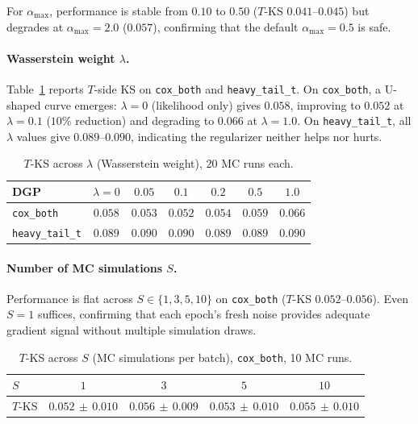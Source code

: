 For $\alpha_{\max}$, performance is stable from $0.10$ to $0.50$
($T$-KS $0.041$--$0.045$) but degrades at $\alpha_{\max} = 2.0$
($0.057$), confirming that the default $\alpha_{\max} = 0.5$ is safe.

\paragraph{Wasserstein weight $\lambda$.}
Table~\ref{tab:sens-lambda} reports $T$-side KS on \texttt{cox\_both}
and \texttt{heavy\_tail\_t}. On \texttt{cox\_both}, a U-shaped curve
emerges: $\lambda = 0$ (likelihood only) gives $0.058$, improving to
$0.052$ at $\lambda = 0.1$ ($10\%$ reduction) and degrading to $0.066$
at $\lambda = 1.0$. On \texttt{heavy\_tail\_t}, all $\lambda$ values
give $0.089$--$0.090$, indicating the regularizer neither helps nor
hurts.

\begin{table}[h]
\caption{$T$-KS across $\lambda$ (Wasserstein weight), 20 MC runs each.}
\label{tab:sens-lambda}
\centering
\small
\begin{tabular}{lcccccc}
\toprule
DGP & $\lambda{=}0$ & $0.05$ & $0.1$ & $0.2$ & $0.5$ & $1.0$ \\
\midrule
\texttt{cox\_both} & $0.058$ & $0.053$ & $\mathbf{0.052}$ & $0.054$ & $0.059$ & $0.066$ \\
\texttt{heavy\_tail\_t} & $0.089$ & $0.090$ & $0.090$ & $0.089$ & $0.089$ & $0.090$ \\
\bottomrule
\end{tabular}
\end{table}

\paragraph{Number of MC simulations $S$.}
Performance is flat across $S \in \{1, 3, 5, 10\}$ on \texttt{cox\_both}
($T$-KS $0.052$--$0.056$). Even $S = 1$ suffices, confirming that each
epoch's fresh noise provides adequate gradient signal without multiple
simulation draws.

\begin{table}[h]
\caption{$T$-KS across $S$ (MC simulations per batch), \texttt{cox\_both}, 10 MC runs.}
\label{tab:sens-S}
\centering
\small
\begin{tabular}{lcccc}
\toprule
$S$ & $1$ & $3$ & $5$ & $10$ \\
\midrule
$T$-KS & $0.052\,{\pm}\,0.010$ & $0.056\,{\pm}\,0.009$ & $0.053\,{\pm}\,0.010$ & $0.055\,{\pm}\,0.010$ \\
\bottomrule
\end{tabular}
\end{table}

